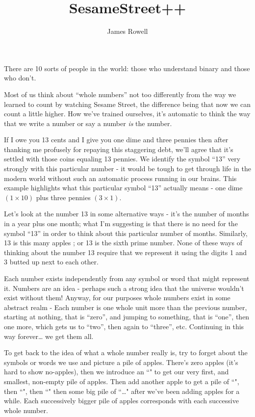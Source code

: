 \documentclass{article}
\title{SesameStreet++}
\author{James Rowell}
\begin{document}
\maketitle
\begin{em}
\small{}There are 10 sorts of people in the world: those who understand binary and those who don't.
\end{em}
\normalsize
\bigskip

Most of us think about ``whole numbers'' not too differently from the way
we learned to count by watching Sesame Street,
the difference being that now we can count a little higher.
How we've trained ourselves, it's automatic to think the way
that we write a number or say a number \emph{is} the number.

If I owe you 13 cents and I give you one dime and three pennies then 
after thanking me profusely for repaying this staggering debt,
we'll agree that it's settled with those coins equaling 13 pennies. 
We identify the symbol ``13'' very strongly with this particular number - it would 
be tough to get through life in the modern world without such an automatic process
running in our brains. 
This example highlights what this particular symbol ``13'' actually means -
one dime $(1 \times 10)$ plus three pennies $(3 \times 1)$.

Let's look at the number 13 in some alternative ways - it's the 
number of months in a year plus one month;
what I'm suggesting is that there is no need for the symbol ``13'' in order
to think about this particular number of months. Similarly, 13 is this many apples
\faApple{}\faApple{}\faApple{}\faApple{}\faApple{}\faApple{}\faApple{}\faApple{}\faApple{}\faApple{}\faApple{}\faApple{}\faApple{};
or 13 is the sixth prime number. None of these ways of thinking about the number
13 require that we represent it using the digits 1 and 3 butted up next to each other.

Each number exists independently from any symbol or word that might represent it.
Numbers are an idea - perhaps such a strong idea that the universe wouldn't exist without them!
Anyway, for our purposes whole numbers exist in some abstract realm -
Each number is one whole unit more than the previous number,
starting at nothing, that is ``zero'', and jumping to something, that is ``one'',
then one more, which gets us to ``two'',
then again to ``three'', etc. Continuing in this way forever\dots{} we get them all.

To get back to the idea of what a whole number really is,
try to forget about the symbols or words we use and picture a pile of apples.
There's zero apples (it's hard to show no-apples),
then we introduce an ``\faApple{}" to get our very first,
and smallest, non-empty pile of apples.
Then add another apple to get a pile of ``\faApple{}\faApple{}",
then ``\faApple{}\faApple{}\faApple{}",
then ``\faApple{}\faApple{}\faApple{}\faApple{}"
then some big pile of
``\faApple{}\faApple{}\faApple{}\faApple{}\faApple{}\dots{}\faApple{}\faApple{}\faApple{}"
after we've been adding apples for a while.
Each successively bigger pile of apples corresponds with each successive whole number.
\end{document}
